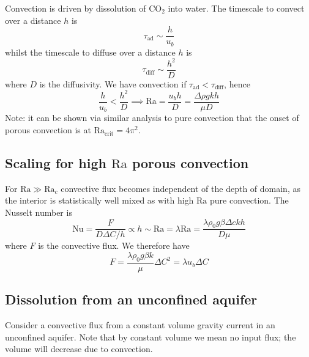 \documentclass{jknotes}
\newcommand{\Ra}{\text{Ra}}
\begin{document}
Convection is driven by dissolution of CO$_2$ into water. The timescale to
convect over a distance $h$ is 
\begin{equation}
	\tau_{\text{ad}} \sim \frac{h}{u_b}
\end{equation}
whilst the timescale to diffuse over a distance $h$ is
\begin{equation}
	\tau_{\text{diff}} \sim \frac{h^2}{D}
\end{equation}
where $D$ is the diffusivity. We have convection if $\tau_{\text{ad}} <
\tau_{\text{diff}}$, hence
\begin{equation}
	\frac{h}{u_b} < \frac{h^2}{D} \implies \Ra = \frac{u_b h}{D} =
	\frac{\Delta \rho g k h }{\mu D}
\end{equation}
Note: it can be shown via similar analysis to pure convection that the onset
of porous convection is at $\Ra_{\text{crit}} = 4\pi^2$.

\subsection{Scaling for high $\Ra$ porous convection}
For $\Ra \gg \Ra_c$ convective flux becomes independent of the depth of
domain, as the interior is statistically well mixed as with high $\Ra$ pure
convection. The Nusselt number is
\begin{equation}
	\text{Nu} = \frac{F}{D\Delta C/h} \propto h \sim \Ra = \lambda \Ra =
	\frac{\lambda \rho_0 g \beta \Delta c k h}{D \mu}
\end{equation}
where $F$ is the convective flux. We therefore have
\begin{equation}
	F = \frac{\lambda \rho_0 g \beta k}{\mu} \Delta C^2 = \lambda u_b \Delta C
\end{equation}

\subsection{Dissolution from an unconfined aquifer}
Consider a convective flux from a constant volume gravity current in an
unconfined aquifer. Note that by constant volume we mean no input flux; the
volume will decrease due to convection.
\begin{center}
\end{center}
\end{document}
